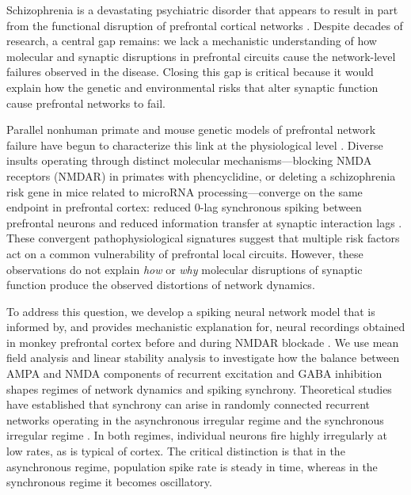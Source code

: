 \documentclass[10pt]{article}
\begin{document}
Schizophrenia is a devastating psychiatric disorder that appears to result in
part from the functional disruption of prefrontal cortical networks
\citep{insel2010rethinking, jauhar2022schizophrenia}. Despite decades of research,
a central gap remains: we lack a mechanistic understanding of how molecular and
synaptic disruptions in prefrontal circuits cause the network-level failures
observed in the disease. Closing this gap is critical because it would explain
how the genetic and environmental risks that alter synaptic function cause
prefrontal networks to fail.

Parallel nonhuman primate and mouse genetic models of prefrontal network failure
have begun to characterize this link at the physiological level
\citep{zick2018blocking, kummerfeld2020cognitive, zick2021disparate}. Diverse
insults operating through distinct molecular mechanisms---blocking NMDA
receptors (NMDAR) in primates with phencyclidine, or deleting a schizophrenia
risk gene in mice related to microRNA processing---converge on the same
endpoint in prefrontal cortex: reduced 0-lag synchronous spiking between
prefrontal neurons and reduced information transfer at synaptic interaction
lags \citep{zick2018blocking, zick2021disparate}. These convergent
pathophysiological signatures suggest that multiple risk factors act on a
common vulnerability of prefrontal local circuits. However, these observations
do not explain \textit{how} or \textit{why} molecular disruptions of synaptic
function produce the observed distortions of network dynamics.

To address this question, we develop a spiking neural network model that is
informed by, and provides mechanistic explanation for, neural recordings
obtained in monkey prefrontal cortex before and during NMDAR blockade
\citep{zick2018blocking}. We use mean field analysis and linear stability
analysis to investigate how the balance between AMPA and NMDA components of
recurrent excitation and GABA inhibition shapes regimes of network dynamics
and spiking synchrony. Theoretical studies have established that synchrony can
arise in randomly connected recurrent networks operating in the asynchronous
irregular regime \citep{brunel2000dynamics, vanvreeswijk1996chaos,
renart2010asynchronous} and the synchronous irregular regime
\citep{brunel2000dynamics, brunel1999fast, brunel2003fast}. In both regimes,
individual neurons fire highly irregularly at low rates, as is typical of
cortex. The critical distinction is that in the asynchronous regime, population
spike rate is steady in time, whereas in the synchronous regime it becomes
oscillatory.
\end{document}
